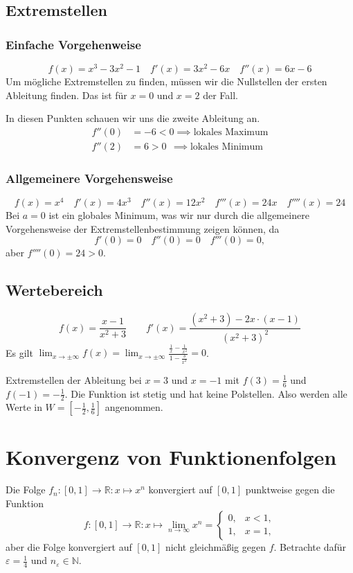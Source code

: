 \documentclass[10pt,a4paper]{article}
\begin{document}
\begin{multicols*}{2}
\subsection*{Extremstellen}

\subsubsection*{Einfache Vorgehenweise}
\[f(x)=x^3-3x^2-1 \quad f'(x)=3x^2-6x \quad f''(x)=6x-6\]
Um mögliche Extremstellen zu finden, müssen wir die Nullstellen der ersten Ableitung finden.
Das ist für $x=0$ und $x=2$ der Fall.

In diesen Punkten schauen wir uns die zweite Ableitung an.
\begin{align*}
	f''(0)&=-6<0 \implies \text{lokales Maximum} \\
	f''(2)&=6>0 ~~\implies \text{lokales Minimum}
\end{align*}

\subsubsection*{Allgemeinere Vorgehensweise}
\[f(x)=x^4 \quad f'(x)=4x^3 \quad f''(x)=12x^2 \quad f'''(x)=24x \quad f''''(x)=24\]
Bei $a=0$ ist ein globales Minimum, was wir nur durch die allgemeinere Vorgehensweise der Extremstellenbestimmung
zeigen können, da
\[f'(0)=0 \quad f''(0)=0 \quad f'''(0)=0,\]
aber $f''''(0)=24>0$.


\subsection*{Wertebereich}
\[f(x)=\frac{x-1}{x^2+3} \qquad f'(x)=\frac{(x^2+3)-2x\cdot(x-1)}{(x^2+3)^2}\]
Es gilt $\displaystyle \lim_{x\to\pm\infty}f(x)=\lim_{x\to\pm\infty}\frac{\frac{1}{x}-\frac{1}{x^2}}{1-\frac{3}{x^2}}=0$.

Extremstellen der Ableitung bei $x=3$ und $x=-1$ mit $f(3)=\frac{1}{6}$ und $f(-1)=-\frac{1}{2}$.
Die Funktion ist stetig und hat keine Polstellen.
Also werden alle Werte in $W=[-\frac{1}{2},\frac{1}{6}]$ angenommen.

\vfill\null
\columnbreak

\section*{Konvergenz von Funktionenfolgen}

Die Folge $f_n:[0,1]\to\mathbb{R}: x\mapsto x^n$ konvergiert auf $[0,1]$ punktweise gegen die Funktion
\[f:[0,1]\to\mathbb{R}:x\mapsto\lim_{n\to\infty}x^n=\begin{cases}0, & x<1,\\ 1, & x=1, \end{cases}\]
aber die Folge konvergiert auf $[0,1]$ nicht gleichmäßig gegen $f$.
Betrachte dafür $\varepsilon=\frac{1}{4}$ und $n_\varepsilon\in\mathbb{N}$.


\end{multicols*}
\end{document}
